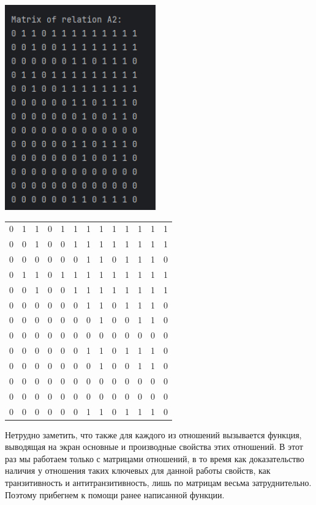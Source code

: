 \documentclass[12pt]{article}
\begin{document}
	\parbox[с][90mm][t]{70mm}{
		\includegraphics[width=65mm]{images/matrix2.png}
	}
	\hspace{2cm}
	\parbox[с][90mm][c]{60mm}{
		\begin{tabular} {c c c c c c c c c c c c c }
			0 & 1 & 1 & 0 & 1 & 1 & 1 & 1 & 1 & 1 & 1 & 1 & 1 \\
			0 & 0 & 1 & 0 & 0 & 1 & 1 & 1 & 1 & 1 & 1 & 1 & 1 \\
			0 & 0 & 0 & 0 & 0 & 0 & 1 & 1 & 0 & 1 & 1 & 1 & 0 \\
			0 & 1 & 1 & 0 & 1 & 1 & 1 & 1 & 1 & 1 & 1 & 1 & 1 \\
			0 & 0 & 1 & 0 & 0 & 1 & 1 & 1 & 1 & 1 & 1 & 1 & 1 \\
			0 & 0 & 0 & 0 & 0 & 0 & 1 & 1 & 0 & 1 & 1 & 1 & 0 \\
			0 & 0 & 0 & 0 & 0 & 0 & 0 & 1 & 0 & 0 & 1 & 1 & 0 \\
			0 & 0 & 0 & 0 & 0 & 0 & 0 & 0 & 0 & 0 & 0 & 0 & 0 \\
			0 & 0 & 0 & 0 & 0 & 0 & 1 & 1 & 0 & 1 & 1 & 1 & 0 \\
			0 & 0 & 0 & 0 & 0 & 0 & 0 & 1 & 0 & 0 & 1 & 1 & 0 \\
			0 & 0 & 0 & 0 & 0 & 0 & 0 & 0 & 0 & 0 & 0 & 0 & 0 \\
			0 & 0 & 0 & 0 & 0 & 0 & 0 & 0 & 0 & 0 & 0 & 0 & 0 \\
			0 & 0 & 0 & 0 & 0 & 0 & 1 & 1 & 0 & 1 & 1 & 1 & 0 \\
			\end{tabular}
	}
	
	Нетрудно заметить, что также для каждого из отношений вызывается функция, выводящая на экран основные и производные свойства этих отношений. В этот раз мы работаем только с матрицами отношений, в то время как доказательство наличия у отношения таких ключевых для данной работы свойств, как транзитивность и антитранзитивность, лишь по матрицам весьма затруднительно. Поэтому прибегнем к помощи ранее написанной функции.
	
\end{document}
